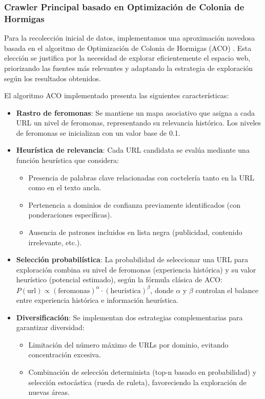 \documentclass[runningheads]{llncs}
\begin{document}
\subsubsection{Crawler Principal basado en Optimización de Colonia de Hormigas}

Para la recolección inicial de datos, implementamos una aproximación novedosa basada en el algoritmo de Optimización de Colonia de Hormigas (ACO) \cite{aco_simple}. Esta elección se justifica por la necesidad de explorar eficientemente el espacio web, priorizando las fuentes más relevantes y adaptando la estrategia de exploración según los resultados obtenidos.

El algoritmo ACO implementado presenta las siguientes características:

\begin{itemize}
    \item \textbf{Rastro de feromonas}: Se mantiene un mapa asociativo que asigna a cada URL un nivel de feromonas, representando su relevancia histórica. Los niveles de feromonas se inicializan con un valor base de 0.1.
    
    \item \textbf{Heurística de relevancia}: Cada URL candidata se evalúa mediante una función heurística que considera:
    \begin{itemize}
        \item Presencia de palabras clave relacionadas con coctelería tanto en la URL como en el texto ancla.
        \item Pertenencia a dominios de confianza previamente identificados (con ponderaciones específicas).
        \item Ausencia de patrones incluidos en lista negra (publicidad, contenido irrelevante, etc.).
    \end{itemize}
    
    \item \textbf{Selección probabilística}: La probabilidad de seleccionar una URL para exploración combina su nivel de feromonas (experiencia histórica) y su valor heurístico (potencial estimado), según la fórmula clásica de ACO:
    $P(\mathrm{url}) \propto (\mathrm{feromonas})^\alpha \cdot (\mathrm{heuristica})^\beta$, donde $\alpha$ y $\beta$ controlan el balance entre experiencia histórica e información heurística.
    
    \item \textbf{Diversificación}: Se implementan dos estrategias complementarias para garantizar diversidad:
    \begin{itemize}
        \item Limitación del número máximo de URLs por dominio, evitando concentración excesiva.
        \item Combinación de selección determinista (top-n basado en probabilidad) y selección estocástica (rueda de ruleta), favoreciendo la exploración de nuevas áreas.
    \end{itemize}
    

\end{itemize}
\end{document}
